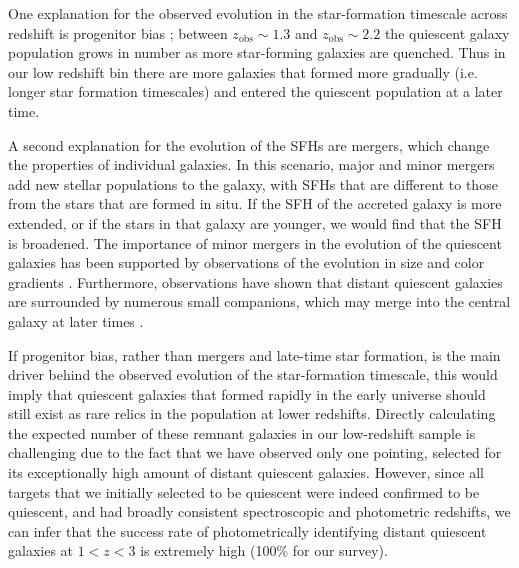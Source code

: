 \documentclass[twocolumn, astrosymb]{aastex631}
\begin{document}
One explanation for the observed evolution in the star-formation timescale across redshift is progenitor bias \citep{PvanDokkum2001a}; between $z_{\text{obs}} \sim 1.3$ and $z_{\text{obs}} \sim 2.2$ the quiescent galaxy population grows in number as more star-forming galaxies are quenched. Thus in our low redshift bin there are more galaxies that formed more gradually (i.e. longer star formation timescales) and entered the quiescent population at a later time.

A second explanation for the evolution of the SFHs are mergers, which change the properties of individual galaxies. In this scenario, major and minor mergers add new stellar populations to the galaxy, with SFHs that are different to those from the stars that are formed in situ. If the SFH of the accreted galaxy is more extended, or if the stars in that galaxy are younger, we would find that the SFH is broadened. The importance of minor mergers in the evolution of the quiescent galaxies has been supported by observations of the evolution in size and color gradients \citep[e.g.,][]{RBezanson2009, TNaab2009, PvanDokkum2010, KSuess2020, KSuess2021, TMiller2023}. Furthermore, observations have shown that distant quiescent galaxies are surrounded by numerous small companions, which may merge into the central galaxy at later times \citep{ANewman2012,KSuess2023}.

If progenitor bias, rather than mergers and late-time star formation, is the main driver behind the observed evolution of the star-formation timescale, this would imply that quiescent galaxies that formed rapidly in the early universe should still exist as rare relics in the population at lower redshifts. Directly calculating the expected number of these remnant galaxies in our low-redshift sample is challenging due to the fact that we have observed only one pointing, selected for its exceptionally high amount of distant quiescent galaxies. However, since all targets that we initially selected to be quiescent were indeed confirmed to be quiescent, and had broadly consistent spectroscopic and photometric redshifts, we can infer that the success rate of photometrically identifying distant quiescent galaxies at $1<z<3$ is extremely high (100\% for our survey).
\end{document}
